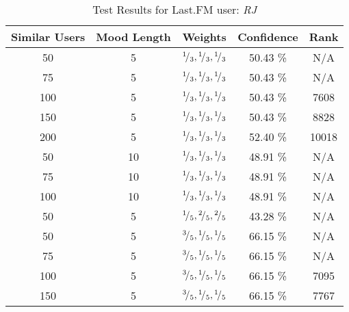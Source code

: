 \begin{table}[h!]
\centering
\begin{tabular}{ | c | c | c || c | c | }
\hline
Similar Users	& Mood Length	& Weights							&Confidence	&Rank\\
\hline \hline
50			& 5			& \({}^{1}\!/_{3}, {}^{1}\!/_{3}, {}^{1}\!/_{3}\)	&50.43 \%		&N/A\\
\hline
75			& 5			& \({}^{1}\!/_{3}, {}^{1}\!/_{3}, {}^{1}\!/_{3}\)	&50.43 \%		&N/A\\
\hline
100			& 5			& \({}^{1}\!/_{3}, {}^{1}\!/_{3}, {}^{1}\!/_{3}\)	&50.43 \%		&7608\\
\hline
150			& 5			& \({}^{1}\!/_{3}, {}^{1}\!/_{3}, {}^{1}\!/_{3}\)	&50.43 \%		&8828\\
\hline
200			& 5			& \({}^{1}\!/_{3}, {}^{1}\!/_{3}, {}^{1}\!/_{3}\)	&52.40 \%		&10018\\
\hline
50			& 10			& \({}^{1}\!/_{3}, {}^{1}\!/_{3}, {}^{1}\!/_{3}\)	&48.91 \%		&N/A\\
\hline
75			& 10			& \({}^{1}\!/_{3}, {}^{1}\!/_{3}, {}^{1}\!/_{3}\)	&48.91 \%		&N/A\\
\hline
100			& 10			& \({}^{1}\!/_{3}, {}^{1}\!/_{3}, {}^{1}\!/_{3}\)	&48.91 \%		&N/A\\
\hline
50			& 5			& \({}^{1}\!/_{5}, {}^{2}\!/_{5}, {}^{2}\!/_{5}\)	&43.28 \%		&N/A\\
\hline
50			& 5			& \({}^{3}\!/_{5}, {}^{1}\!/_{5}, {}^{1}\!/_{5}\)	&66.15 \%		&N/A\\
\hline
75			& 5			& \({}^{3}\!/_{5}, {}^{1}\!/_{5}, {}^{1}\!/_{5}\)	&66.15 \%		&N/A\\
\hline
100			& 5			& \({}^{3}\!/_{5}, {}^{1}\!/_{5}, {}^{1}\!/_{5}\)	&66.15 \%		&7095\\
\hline
150			& 5			& \({}^{3}\!/_{5}, {}^{1}\!/_{5}, {}^{1}\!/_{5}\)	&66.15 \%		&7767\\
\hline
\end{tabular}
\caption{Test Results for Last.FM user: \emph{RJ}}
\label{table:test_results_rj}
\end{table}

